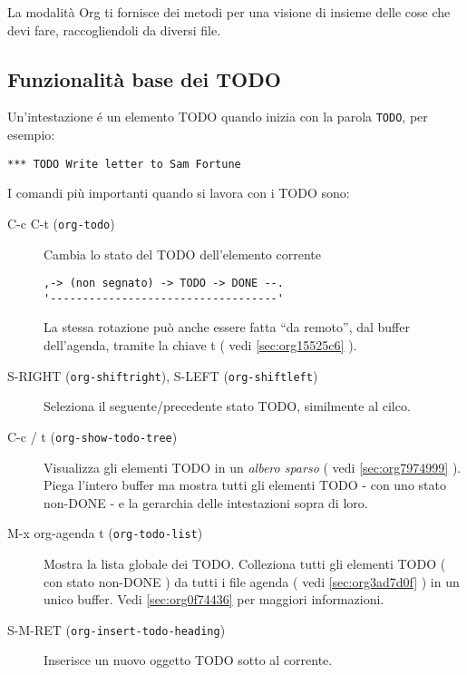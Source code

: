 \documentclass[11pt]{article}
\begin{document}
La modalità Org ti fornisce dei metodi per una visione di insieme
delle cose che devi fare, raccogliendoli da diversi file.

\subsection[TODO Basics]{Funzionalità base dei TODO}
\label{sec:orgcd98aa1}
Un'intestazione é un elemento TODO quando inizia con la parola \texttt{TODO},
per esempio:

\begin{verbatim}
*** TODO Write letter to Sam Fortune
\end{verbatim}


I comandi più importanti quando si lavora con i TODO sono:

\begin{description}
\item[{C-c C-t (\texttt{org-todo})}] Cambia lo stato del TODO dell'elemento corrente

\begin{verbatim}
,-> (non segnato) -> TODO -> DONE --.
'-----------------------------------'
\end{verbatim}


La stessa rotazione può anche essere fatta ``da remoto'', dal buffer
dell'agenda, tramite la chiave t ( vedi \ref{sec:org15525c6} ).

\item[{S-RIGHT (\texttt{org-shiftright}), S-LEFT (\texttt{org-shiftleft})}] Seleziona il seguente/precedente stato TODO, similmente al cilco.

\item[{C-c / t (\texttt{org-show-todo-tree})}] Visualizza gli elementi TODO in un \emph{albero sparso} ( vedi \ref{sec:org7974999} ). Piega l'intero buffer ma mostra tutti gli elementi
TODO - con uno stato non-DONE - e la gerarchia delle intestazioni
sopra di loro.

\item[{M-x org-agenda t (\texttt{org-todo-list})}] Mostra la lista globale dei TODO. Colleziona tutti gli elementi TODO
( con stato non-DONE ) da tutti i file agenda ( vedi
\ref{sec:org3ad7d0f} ) in un unico buffer. Vedi \ref{sec:org0f74436} per maggiori informazioni.

\item[{S-M-RET (\texttt{org-insert-todo-heading})}] Inserisce un nuovo oggetto TODO sotto al corrente.
\end{description}
\end{document}
